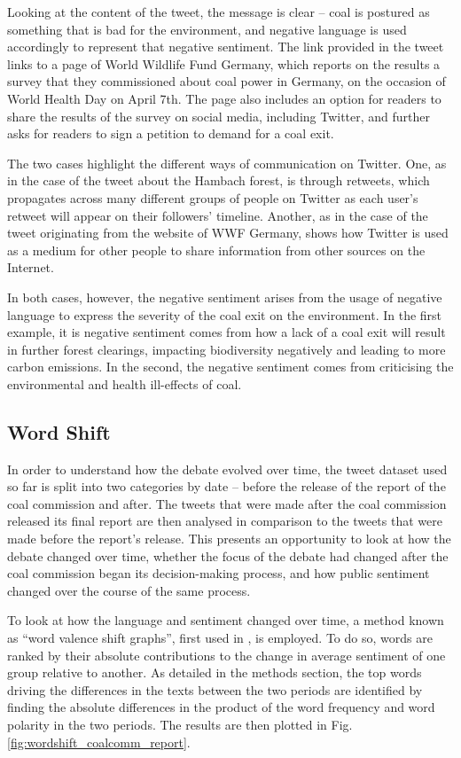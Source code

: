 \documentclass[12pt,onecolumn,twoside]{layout}
\begin{document}
Looking at the content of the tweet, the message is clear -- coal is postured as something that is bad for the environment, and negative language is used accordingly to represent that negative sentiment. The link provided in the tweet links to a page of World Wildlife Fund Germany, which reports on the results a survey that they commissioned about coal power in Germany, on the occasion of World Health Day on April 7th. The page also includes an option for readers to share the results of the survey on social media, including Twitter, and further asks for readers to sign a petition to demand for a coal exit. 

The two cases highlight the different ways of communication on Twitter. One, as in the case of the tweet about the Hambach forest, is through retweets, which propagates across many different groups of people on Twitter as each user's retweet will appear on their followers' timeline. Another, as in the case of the tweet originating from the website of WWF Germany, shows how Twitter is used as a medium for other people to share information from other sources on the Internet. 

In both cases, however, the negative sentiment arises from the usage of negative language to express the severity of the coal exit on the environment. In the first example, it is negative sentiment comes from how a lack of a coal exit will result in further forest clearings, impacting biodiversity negatively and leading to more carbon emissions. In the second, the negative sentiment comes from criticising the environmental and health ill-effects of coal. 

\subsection*{Word Shift}
In order to understand how the debate evolved over time, the tweet dataset used so far is split into two categories by date -- before the release of the report of the coal commission and after. The tweets that were made after the coal commission released its final report are then analysed in comparison to the tweets that were made before the report's release. This presents an opportunity to look at how the debate changed over time, whether the focus of the debate had changed after the coal commission began its decision-making process, and how public sentiment changed over the course of the same process. 

To look at how the language and sentiment changed over time, a method known as ``word valence shift graphs'', first used in \cite{Dodds2011}, is employed. To do so, words are ranked by their absolute contributions to the change in average sentiment of one group relative to another. As detailed in the methods section, the top words driving the differences in the texts between the two periods are identified by finding the absolute differences in the product of the word frequency and word polarity in the two periods. The results are then plotted in Fig. \ref{fig:wordshift_coalcomm_report}. 
\end{document}
